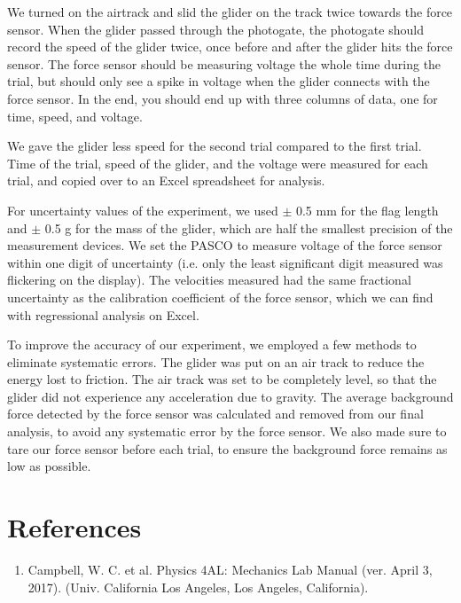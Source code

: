 \documentclass[11pt]{report}
\begin{document}
We turned on the airtrack and slid the glider on the track twice towards
the force sensor.  When the glider passed through the photogate, the photogate
should record the speed of the glider twice, once before and after the glider
hits the force sensor.  The force sensor should be measuring voltage the whole
time during the trial, but should only see a spike in voltage when the glider
connects with the force sensor.  In the end, you should end up with three
columns of data, one for time, speed, and voltage.

We gave the glider less speed for the second trial compared
to the first trial.  Time of the trial, speed of the glider, and the voltage
were measured for each trial, and copied over to an Excel spreadsheet for
analysis.  

For uncertainty values of the experiment, we used $\pm$ 0.5 mm for the flag length and
$\pm$ 0.5 g for the mass of the glider, which are half the smallest precision of the
measurement devices.  We set the PASCO to measure voltage of the force sensor
within one digit of uncertainty (i.e. only the least significant digit measured
was flickering on the display).  The velocities measured had the same fractional
uncertainty as the calibration coefficient of the force sensor, which we can
find with regressional analysis on Excel.

To improve the accuracy of our experiment, we employed a few methods to
eliminate systematic errors.  The glider was put on an air track to reduce the
energy lost to friction.  The air track was set to be completely level, so that
the glider did not experience any acceleration due to gravity.  The average
background force detected by the force sensor was calculated and removed from
our final analysis, to avoid any systematic error by the force sensor.  
We also made sure to tare our force sensor before each trial, to ensure the 
background force remains as low as possible.  




\newpage
\section*{References}
\begin{enumerate}
    \item Campbell, W. C. et al. Physics 4AL: Mechanics Lab Manual (ver. April
        3, 2017). (Univ. California Los Angeles, Los Angeles, California).
\end{enumerate}
\end{document}
